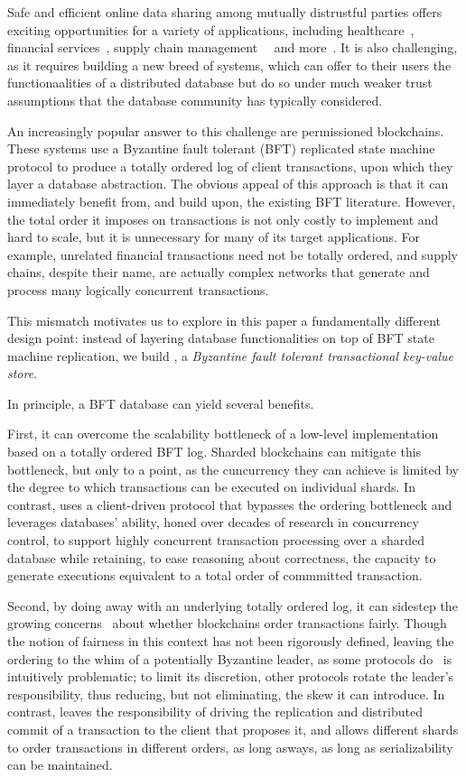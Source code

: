Safe and efficient online data sharing among mutually distrustful
parties offers exciting opportunities for a variety of applications,
including healthcare~\cite{}, financial services~\cite{}, supply chain
management~~\cite{} and more~\cite{}. It is also challenging, as it
requires building a new breed of systems, which can offer to their
users the functionaalities of a distributed database but do so under
much weaker trust assumptions that the database community has
typically considered.

An increasingly popular answer to this challenge are permissioned
blockchains. These systems use a Byzantine fault tolerant (BFT)
replicated state machine protocol\cite{} to produce a totally ordered
log of client transactions, upon which they layer a database
abstraction.  The obvious appeal of this approach is that it can
immediately benefit from, and  build upon, the existing BFT
literature. However, the total order it imposes on transactions is not
only costly to implement and hard to scale, but it is unnecessary for
many of its target applications. For example, unrelated financial
transactions need not be totally ordered, and supply chains, despite
their name, are actually complex networks that generate and process
many logically concurrent transactions.

This mismatch motivates us to explore in this paper a fundamentally
different design point: instead of layering database functionalities on top
of BFT state machine replication, we build \sys,  a
{\em Byzantine fault tolerant transactional key-value store}.

In principle, a BFT database can yield several benefits.

First, it can overcome the scalability bottleneck of a low-level
implementation based on a totally ordered BFT log. Sharded blockchains
can mitigate this bottleneck, but only to a point, as the cuncurrency
they can achieve is limited by the degree to which transactions can be
executed on individual shards. In contrast, \sys uses a
client-driven protocol that bypasses the ordering bottleneck and
leverages databases' ability, honed over decades of research in
concurrency control, to support highly concurrent transaction
processing over a sharded database while retaining, to ease reasoning
about correctness, the capacity to generate executions equivalent to a
total order of commmitted transaction.


Second, by doing away with an underlying totally ordered log, it can
sidestep the growing concerns~\cite{} about whether blockchains
order transactions fairly. Though the notion of fairness in this
context has not been rigorously defined, leaving the ordering to the
whim of a potentially Byzantine leader, as some protocols do~\cite{}
is intuitively problematic; to limit its discretion, other protocols
rotate the leader's responsibility, thus reducing, but not
eliminating, the skew it can introduce. In contrast, \sys leaves the
responsibility of driving the replication and distributed commit of a
transaction to the client that proposes it, and allows different
shards to order transactions in different orders, as long asways, as
long as serializability can be maintained.

